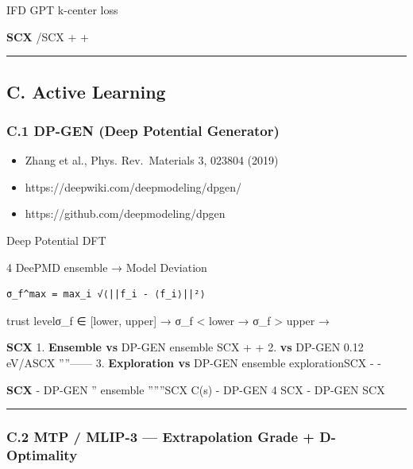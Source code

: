 \documentclass[
  12pt,
]{article}
\providecommand{\tightlist}{%
  \setlength{\itemsep}{0pt}\setlength{\parskip}{0pt}}
\begin{document}
\textbf{}IFD GPT
\textbf{}k-center
\textbf{}loss 

\textbf{SCX
}/\textbf{}\textbf{}SCX
 +  +


\begin{center}\rule{0.5\linewidth}{0.5pt}\end{center}

\subsection{C. Active Learning}\label{c.-active-learning}

\subsubsection{C.1 DP-GEN (Deep Potential
Generator)}\label{c.1-dp-gen-deep-potential-generator}

\begin{itemize}
\tightlist
\item
  \textbf{}Zhang et al., Phys. Rev.~Materials 3, 023804 (2019)
\item
  \textbf{}https://deepwiki.com/deepmodeling/dpgen/
\item
  \textbf{}https://github.com/deepmodeling/dpgen
\end{itemize}

\textbf{} Deep Potential
DFT 

\textbf{} 4  DeePMD  ensemble →
Model Deviation

\begin{verbatim}
σ_f^max = max_i √⟨||f_i - ⟨f_i⟩||²⟩
\end{verbatim}

trust levelσ\_f ∈ {[}lower, upper{]} →
σ\_f \textless{} lower → σ\_f \textgreater{} upper
→ 

\textbf{ SCX } 1. \textbf{Ensemble vs }DP-GEN
 ensemble SCX  +  +
 2. \textbf{ vs }DP-GEN
 0.12 eV/ASCX
''''------
3. \textbf{Exploration  vs }DP-GEN  ensemble
explorationSCX  -  -


\textbf{SCX } - DP-GEN '' ensemble
''''''SCX
 C(s)  - DP-GEN  4
SCX  - DP-GEN
SCX 

\begin{center}\rule{0.5\linewidth}{0.5pt}\end{center}

\subsubsection{C.2 MTP / MLIP-3 --- Extrapolation Grade +
D-Optimality}\label{c.2-mtp-mlip-3-extrapolation-grade-d-optimality}
\end{document}
